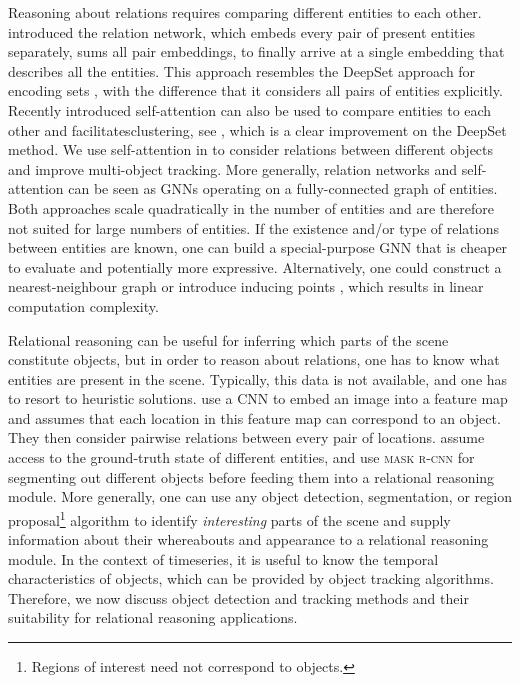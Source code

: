 Reasoning about relations requires comparing different entities to each other.
\cite{Santoro2017} introduced the relation network, which embeds every pair of present entities separately, sums all pair embeddings, to finally arrive at a single embedding that describes all the entities.
This approach resembles the DeepSet approach for encoding sets \citep{Zaheer2017}, with the difference that it considers all pairs of entities explicitly.
Recently introduced self-attention \citep{Vaswani17} can also be used to compare entities to each other and facilitates\eg clustering, see \cite{Lee2019set}, which is a clear improvement on the DeepSet method.
We use self-attention in  to consider relations between different objects and improve multi-object tracking.
More generally, relation networks and self-attention can be seen as \glspl{GNN} operating on a fully-connected graph of entities.
Both approaches scale quadratically in the number of entities and are therefore not suited for large numbers of entities. 
If the existence and/or type of relations between entities are known, one can build a special-purpose \gls{GNN} \citep{Schlichtkrull2017relgraph} that is cheaper to evaluate and potentially more expressive.
Alternatively, one could construct a nearest-neighbour graph \citep{Ramachandran2019standalone} or introduce inducing points \citep{Lee2019set}, which results in linear computation complexity.

Relational reasoning can be useful for inferring which parts of the scene constitute objects, but in order to reason about relations, one has to know what entities are present in the scene. 
Typically, this data is not available, and one has to resort to heuristic solutions.
\cite{Santoro2017} use a \gls{CNN} to embed an image into a feature map and assumes that each location in this feature map can correspond to an object. 
They then consider pairwise relations between every pair of locations.
\cite{Battaglia2016,Baker2019tooluse} assume access to the ground-truth state of different entities, and \cite{Yi2019cleverer} use \textsc{mask r-cnn} \citep{He2017maskrcnn} for segmenting out different objects before feeding them into a relational reasoning module.
More generally, one can use any object detection, segmentation, or region proposal\footnote{Regions of interest need not correspond to objects.} algorithm to identify \textit{interesting} parts of the scene and supply information about their whereabouts and appearance to a relational reasoning module.
In the context of timeseries, it is useful to know the temporal characteristics of objects, which can be provided by object tracking algorithms.
Therefore, we now discuss object detection and tracking methods and their suitability for relational reasoning applications.

